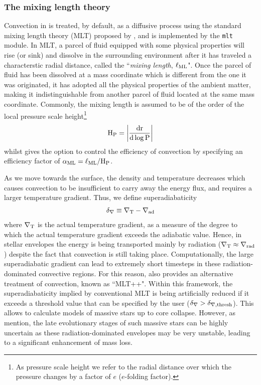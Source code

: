 \documentclass[../../main/thesis_msc.tex]{subfiles}
\begin{document}
				\subsubsection{The mixing length theory}
					Convection in \mesa is treated, by default, as a diffusive process using the standard mixing length theory (MLT) proposed by \cite{cox1968}, and is implemented by the \texttt{mlt} module. In MLT, a parcel of fluid equipped with some physical properties will rise (or sink) and dissolve in the surrounding environment after it has traveled a characterstic radial distance, called the ``\textit{mixing length}, $\ell_{\rm ML}$". Once the parcel of fluid has been dissolved at a mass coordinate which is different from the one it was originated, it has adopted all the physical properties of the ambient matter, making it indistinguishable from another parcel of fluid located at the same mass coordinate. Commonly, the mixing length is assumed to be of the order of the local pressure scale height\footnote{As pressure scale height we refer to the radial distance over which the pressure changes by a factor of $e$ ($e$-folding factor).}
					\begin{align}
						\rm H_P = \left| \frac{dr}{d \log P} \right|
					\end{align}
					whilst \mesa gives the option to control the efficiency of convection by specifying an efficiency factor of $\displaystyle \alpha_{\rm ML} = \ell_{\rm ML} / \rm H_P$.
				
					As we move towards the surface, the density and temperature decreases which causes convection to be insufficient to carry away the energy flux, and requires a larger temperature gradient. Thus, we define superadiabaticity 
					\begin{align}
						\rm \delta_{\nabla} \equiv \nabla_T - \nabla_{ad}				
					\end{align}
					where $\rm \nabla_T$ is the actual temperature gradient, as a measure of the degree to which the actual temperature gradient exceeds the adiabatic value. Hence, in stellar envelopes the energy is being transported mainly by radiation ($\rm \nabla_T \approx \nabla_{rad}$) despite the fact that convection is still taking place. Computationally, the large superadiabatic gradient can lead to extremely short timesteps in these radiation-dominated convective regions. For this reason, \mesa also provides an alternative treatment of convection, known as ``MLT++". Within this framework, the superadiabaticity implied by conventional MLT is being artificially reduced if it exceeds a threshold value that can be specified by the user ($\rm \delta_{\nabla} > \delta_{\nabla, thresh}$). This allows \mesa to calculate models of massive stars up to core collapse. However, as \cite{Paxton:2013pj} mention, the late evolutionary stages of such massive stars can be highly uncertain as these radiation-dominated envelopes may be very unstable, leading to a significant enhancement of mass loss.
				 
\end{document}
